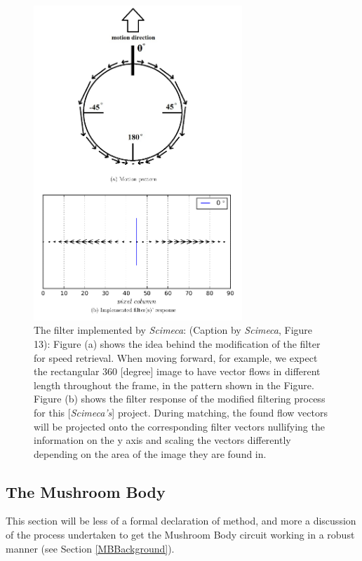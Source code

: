 \documentclass[a4paper,11pt,twoside,openright]{article}
\begin{document}
\begin{figure}
  \centering
  \includegraphics[width=0.7\textwidth]{LucaFilterModel}
  \caption{
    \label{fig:flowfilter} The filter implemented by \textit{Scimeca}: (Caption by \textit{Scimeca}, Figure 13):
    Figure (a) shows the idea behind the modification of the filter for speed retrieval. When moving
    forward, for example, we expect the rectangular 360 [degree] image to have vector flows in
    different length throughout the frame, in the pattern shown in the Figure.
    \newline
    Figure (b) shows the filter response of the modified filtering process for this [\textit{Scimeca's}] project.
    During matching, the found flow vectors will be projected onto the corresponding filter vectors
    nullifying the information on the y axis and scaling the vectors differently depending on the
    area of the image they are found in.
  }
\end{figure}
\FloatBarrier
\subsection{The Mushroom Body}
This section will be less of a formal declaration of method, and more a discussion of the process undertaken to get
the Mushroom Body circuit working in a robust manner (see Section \ref{MBBackground}).
\newline
\end{document}

